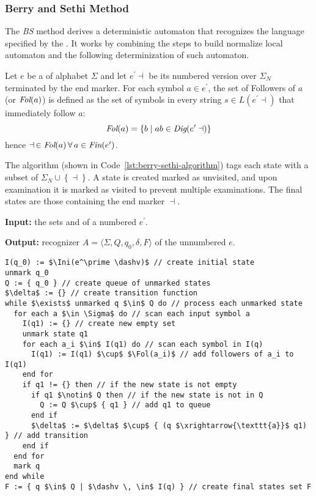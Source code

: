 \documentclass[english]{article}
\begin{document}
\subsubsection{Berry and Sethi Method}

The \textit{BS} method derives a deterministic automaton that recognizes the language specified by the \re.
It works by combining the steps to build normalize local automaton and the following determinization of such automaton.

Let \(e\) be a \re of alphabet \(\Sigma\) and let \(e^\prime \dashv\) be its numbered version over \(\Sigma_N\) terminated by the end marker.
For each symbol \(a \in e^\prime\), the set of Followers of \(a\) (or \(\textit{Fol}(a)\)) is defined as the set of symbols in every string \(s \in L(e^\prime \dashv)\) that immediately follow \(a\):
\[ \textit{Fol}(a) = \left\{ b \mid ab \in \textit{Dig}(e^\prime \dashv) \right\} \]
hence \( \dashv \, \in \textit{Fol}(a) \, \forall \, a \in \textit{Fin}(e^\prime) \).

The algorithm (shown in Code~\ref{lst:berry-sethi-algorithm}) tags each state with a subset of \(\Sigma_N \cup \left\{ \dashv \right\}\).
A state is created marked as unvisited, and upon examination it is marked as visited to prevent multiple examinations.
The final states are those containing the end marker \(\dashv\).

\bigskip
\textbf{Input:}
the sets \Ini and \Fol of a numbered \re \(e^\prime\).

\textbf{Output:}
recognizer \(A = \langle \Sigma, Q, q_0, \delta,  F \rangle\) of the unnumbered \re \(e\).

\begin{lstlisting}[caption={Berry and Sethi Algorithm}, label=lst:berry-sethi-algorithm]
I(q_0) := $\Ini(e^\prime \dashv)$ // create initial state
unmark q_0
Q := { q_0 } // create queue of unmarked states
$\delta$ := {} // create transition function
while $\exists$ unmarked q $\in$ Q do // process each unmarked state
  for each a $\in \Sigma$ do // scan each input symbol a
    I(q1) := {} // create new empty set
    unmark state q1
    for each a_i $\in$ I(q1) do // scan each symbol in I(q)
      I(q1) := I(q1) $\cup$ $\Fol(a_i)$ // add followers of a_i to I(q1)
    end for
    if q1 != {} then // if the new state is not empty
      if q1 $\notin$ Q then // if the new state is not in Q
        Q := Q $\cup$ { q1 } // add q1 to queue
      end if
      $\delta$ := $\delta$ $\cup$ { (q $\xrightarrow{\texttt{a}}$ q1) } // add transition
    end if
  end for
  mark q
end while
F := { q $\in$ Q | $\dashv \, \in$ I(q) } // create final states set F
\end{lstlisting}
\end{document}
